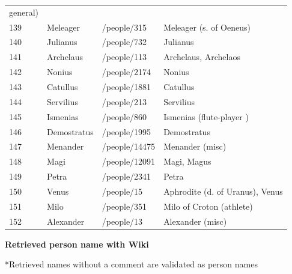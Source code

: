 \documentclass[
  12pt,
]{article}
\begin{document}
\begin{longtable}[]{@{}llll@{}}
general) \\
139 & Meleager & /people/315 & Meleager (s. of Oeneus) \\
140 & Julianus & /people/732 & Julianus \\
141 & Archelaus & /people/113 & Archelaus, Archelaos \\
142 & Nonius & /people/2174 & Nonius \\
143 & Catullus & /people/1881 & Catullus \\
144 & Servilius & /people/213 & Servilius \\
145 & Ismenias & /people/860 & Ismenias (flute-player ) \\
146 & Demostratus & /people/1995 & Demostratus \\
147 & Menander & /people/14475 & Menander (misc) \\
148 & Magi & /people/12091 & Magi, Magus \\
149 & Petra & /people/2341 & Petra \\
150 & Venus & /people/15 & Aphrodite (d. of Uranus), Venus \\
151 & Milo & /people/351 & Milo of Croton (athlete) \\
152 & Alexander & /people/13 & Alexander (misc) \\
\end{longtable}

\newpage

\textbf{Retrieved person name with Wiki}

*Retrieved names without a comment are validated as person names
\end{document}
